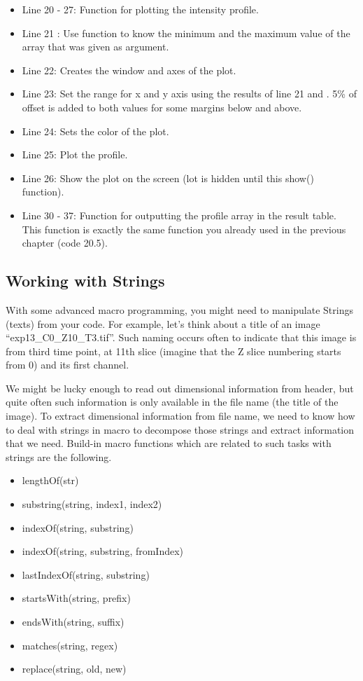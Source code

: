 \begin{itemize}
\item Line 20 - 27: Function for plotting the intensity profile.
\item Line 21 : Use  function to know the minimum and
the maximum value of the array that was given as argument.
\item Line 22: Creates the window and axes of the plot. 
\item Line 23: Set the range for x and y axis using the results of line 21
 and . 5\% of offset is added to both values for some
margins below and above.
\item Line 24: Sets the color of the plot. 
\item Line 25: Plot the profile. 
\item Line 26: Show the plot on the screen (lot is hidden until this show()
function).

\item Line 30 - 37: Function for outputting the profile array in the result
table. This function is exactly the same function you already used in the
previous chapter (code 20.5).

\end{itemize}


\subsection{Working with Strings}

With some advanced macro programming, you might need to manipulate Strings (texts) from your code. For example, let's think about a title of an image ``exp13\_C0\_Z10\_T3.tif''. Such naming occurs often to indicate that this image is from third time point, at 11th slice (imagine that the Z slice numbering starts from 0) and its first channel. 

We might be lucky enough to read out dimensional information from header, but quite often such information is only available in the file name (the title of the image). To extract dimensional information from file name, we need to know how to deal with strings in macro to decompose those strings and extract information that we need. Build-in macro functions which are related to such tasks with strings are the following. 

\begin{itemize}
\item lengthOf(str)
\item substring(string, index1, index2)
\item indexOf(string, substring)
\item indexOf(string, substring, fromIndex)
\item lastIndexOf(string, substring)
\item startsWith(string, prefix)
\item endsWith(string, suffix)
\item matches(string, regex)
\item replace(string, old, new)
\end{itemize}

